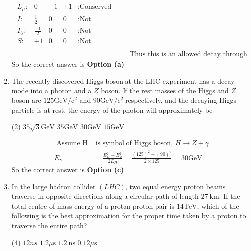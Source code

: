 \begin{enumerate}
\begin{answer}
\begin{align*}
\begin{array}{lllll}
		L_\mu:&0&-1&+1&\text{:Conserved}\\
		I:&\frac{1}{2}&0&0&:\text{Not Conserved}\\
		I_3:&\frac{-1}{2}&0&0&:\text{Not Conserved}\\
		S:&+1&0&0&:\text{Not Conserved}\\
		\end{array}\\
		&\text { Thus this is an allowed decay through weak interaction. }
		\end{align*}
		So the correct answer is \textbf{Option (a)}
	\end{answer}
	\item  The recently-discovered Higgs boson at the LHC experiment has a decay mode into a photon and a $Z$ boson. If the rest masses of the Higgs and $Z$ boson are $125 \mathrm{GeV} / \mathrm{c}^2$ and $90 \mathrm{GeV} / \mathrm{c}^2$ respectively, and the decaying Higgs particle is at rest, the energy of the photon will approximately be
	{}
	\begin{tasks}(2)
		\task[\textbf{a.}] $35 \sqrt{3} \mathrm{GeV}$
		\task[\textbf{b.}]$35 \mathrm{GeV}$
		\task[\textbf{c.}] $30 \mathrm{GeV}$
		\task[\textbf{d.}] $15 \mathrm{GeV}$
	\end{tasks}
	\begin{answer}
		\begin{align*}
		\text { Assume } \mathrm{H} &\text { is symbol of Higgs boson, } H \rightarrow Z+\gamma\\
		E_\gamma&=\frac{E_H^2-E_Z^2}{2 E_H}=\frac{(125)^2-(90)^2}{2 \times 125}=30 \mathrm{GeV}
		\end{align*}
		So the correct answer is \textbf{Option (c)}
	\end{answer}
	\item  In the large hadron collider $(L H C)$, two equal energy proton beams traverse in opposite directions along a circular path of length $27 \mathrm{~km}$. If the total centre of mass energy of a proton-proton pair is $14 \mathrm{TeV}$, which of the following is the best approximation for the proper time taken by a proton to traverse the entire path?
	{}
	\begin{tasks}(4)
		\task[\textbf{a.}]$12 n s$
		\task[\textbf{b.}]$1.2 \mu \mathrm{s}$
		\task[\textbf{c.}]$1.2 \mathrm{~ns}$
		\task[\textbf{d.}] $0.12 \mu \mathrm{s}$ 
	\end{tasks}
	\begin{answer}
		\begin{align*}

\end{align*}
\end{answer}
\end{enumerate}
